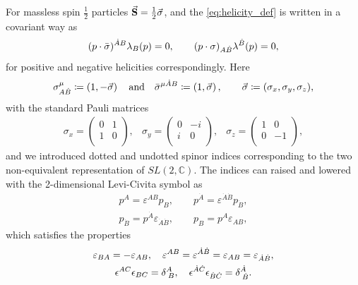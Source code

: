 For massless spin $\frac{1}{2}$ particles $\va{S} = \frac{1}{2}\va{\sigma}$, and 
the \cref{eq:helicity_def} is written in a covariant way as
\begin{equation}
  (\sp(p,\bar{\sigma}))^{\dot{A}B} \lambda_B(p) = 0, \qquad (\sp(p,\sigma))_{A\dot{B}} \lambda^{\dot{B}}(p) = 0,
\end{equation}
for positive and negative helicities correspondingly.
Here 
\begin{equation}
  \sigma_{A \dot{B}}^{\mu} \coloneqq  \left( 1 , - \vec{\sigma} \right) \qand \bar{\sigma}^{\mu \dot{A} B} \coloneqq  \left( 1 ,  \vec{\sigma} \right),
  \qquad \vec{\sigma}\coloneqq (\sigma_x,\sigma_y,\sigma_z),
\end{equation} 
with the standard Pauli matrices
\begin{eqnarray}
  \sigma_x = \left(\begin{array}{cc}
    0 & 1\\
    1 & 0 \\
  \end{array} \right),
  &
  \sigma_y = \left(\begin{array}{cc}
    0 & -i\\
    i & 0 \\
  \end{array} \right),
  &
  \sigma_z = \left(\begin{array}{cc}
    1 & 0\\
    0 & -1 \\
  \end{array} \right),
\end{eqnarray}
and we introduced dotted and undotted spinor indices corresponding to the two non-equivalent representation of $SL(2,\mathbb{C})$.
The indices can raised and lowered with the 2-dimensional Levi-Civita symbol as
\begin{equation}
    \label{raising_and_lowering_spinor_indices}
  \begin{gathered}
    p^A = \varepsilon^{AB} p_B, \qquad
    p^{\dot{A}} = \varepsilon^{\dot{A}\dot{B}} p_{\dot{B}}, \\
    p_{\dot{B}} = p^{\dot{A}} \varepsilon_{\dot{A}\dot{B}},  \qquad
    p_B = p^A \varepsilon_{AB},
  \end{gathered}
\end{equation}
which satisfies the properties
\begin{equation}
  \begin{gathered}
    \varepsilon_{BA} = - \varepsilon_{AB},  \quad   \varepsilon^{AB} = \varepsilon^{\dot{A}\dot{B}} = \varepsilon_{AB} = \varepsilon_{\dot{A}\dot{B}}, \\
    \epsilon^{A C} \epsilon_{B C} = \delta^{A}_{\;B}, \quad \epsilon^{\dot{A} \dot{C}} \epsilon_{\dot{B} \dot{C}} = \delta^{\dot{A}}_{\;\dot{B}}.
  \end{gathered}
\end{equation}
